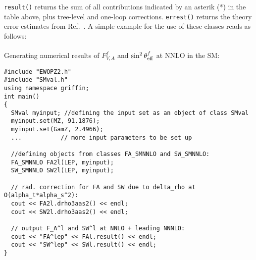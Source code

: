 \documentclass[12pt]{article}
\newcommand{\seff}[1]{\sin^2\theta_{\rm eff}^{#1}}
\newcommand{\fva}[1]{F_{V,A}^{#1}}
\begin{document}
\texttt{result()} returns the sum of all contributions indicated by an asterik (*) in the table above, plus tree-level and one-loop corrections. \texttt{errest()} returns the theory error estimates from Ref.~\cite{Dubovyk:2019szj}. A simple example for the use of these classes reads as follows:

\paragraph{}Generating numerical results of $\fva f$ and $\seff f$ at NNLO in the SM: \label{fig:codeeg3}
{    \centering
\begin{lstlisting}
#include "EWOPZ2.h"
#include "SMval.h"
using namespace griffin;
int main()
{
  SMval myinput; //defining the input set as an object of class SMval
  myinput.set(MZ, 91.1876);
  myinput.set(GamZ, 2.4966);
  ...           // more input parameters to be set up

  //defining objects from classes FA_SMNNLO and SW_SMNNLO:
  FA_SMNNLO FA2l(LEP, myinput);
  SW_SMNNLO SW2l(LEP, myinput); 

  // rad. correction for FA and SW due to delta_rho at O(alpha_t*alpha_s^2):
  cout << FA2l.drho3aas2() << endl;
  cout << SW2l.drho3aas2() << endl;
  
  // output F_A^l and SW^l at NNLO + leading NNNLO:
  cout << "FA^lep" << FAl.result() << endl; 
  cout << "SW^lep" << SWl.result() << endl; 
}
\end{lstlisting}}
\end{document}
